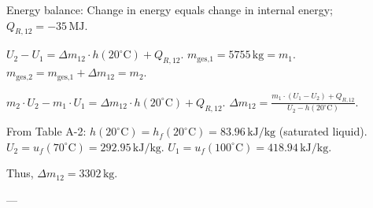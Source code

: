 Energy balance:  
Change in energy equals change in internal energy; \( Q_{R,12} = -35 \, \text{MJ} \).  

\( U_2 - U_1 = \Delta m_{12} \cdot h(20^\circ \text{C}) + Q_{R,12} \).  
\( m_{\text{ges,1}} = 5755 \, \text{kg} = m_1 \).  
\( m_{\text{ges,2}} = m_{\text{ges,1}} + \Delta m_{12} = m_2 \).  

\( m_2 \cdot U_2 - m_1 \cdot U_1 = \Delta m_{12} \cdot h(20^\circ \text{C}) + Q_{R,12} \).  
\( \Delta m_{12} = \frac{m_1 \cdot (U_1 - U_2) + Q_{R,12}}{U_2 - h(20^\circ \text{C})} \).  

From Table A-2:  
\( h(20^\circ \text{C}) = h_f(20^\circ \text{C}) = 83.96 \, \text{kJ/kg} \) (saturated liquid).  
\( U_2 = u_f(70^\circ \text{C}) = 292.95 \, \text{kJ/kg} \).  
\( U_1 = u_f(100^\circ \text{C}) = 418.94 \, \text{kJ/kg} \).  

Thus, \( \Delta m_{12} = 3302 \, \text{kg} \).  

---